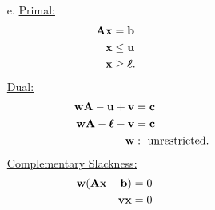 \documentclass[12pt]{amsart}
\begin{document}
\begin{enumerate}
	\item[e.]
	\underline{Primal:}
	\begin{align*}
		\mathbf{Ax} &= \mathbf{b} \hspace{35ex}\\
		\mathbf{x} &\leq \mathbf{u} \\
		\mathbf{x} &\geq \boldsymbol{\ell}.
	\end{align*}
	\underline{Dual:}
	\begin{align*}
		\mathbf{wA}- \mathbf{u} + \mathbf{v} &= \mathbf{c} \hspace{35ex}\\
		\mathbf{wA}- \boldsymbol{\ell} - \mathbf{v} &= \mathbf{c} \\
		\mathbf{w} &:\text{ unrestricted}.
	\end{align*}
	\underline{Complementary Slackness:}
	\begin{align*}
		\mathbf{w}(\mathbf{Ax}-\mathbf{b}) &=0 \hspace{35ex}\\
		\mathbf{vx} &= 0
	\end{align*}
	
\end{enumerate}
\end{document}

